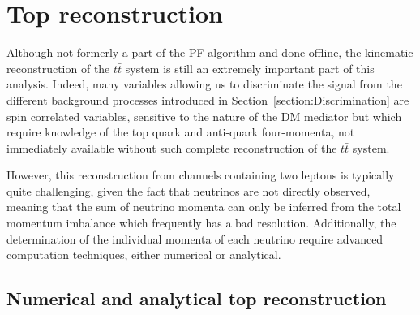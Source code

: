 \documentclass[a4paper, 10pt, openright]{report}
\begin{document}
\section{Top reconstruction} \label{section:RecoTop}

Although not formerly a part of the \ac{PF} algorithm and done offline, the kinematic reconstruction of the $t \bar t$ system is still an extremely important part of this analysis. Indeed, many variables allowing us to discriminate the signal from the different background processes introduced in Section~\ref{section:Discrimination} are spin correlated variables, sensitive to the nature of the \ac{DM} mediator but which require knowledge of the top quark and anti-quark four-momenta, not immediately available without such complete reconstruction of the $t \bar t$ system. 

However, this reconstruction from channels containing two leptons is typically quite challenging, given the fact that neutrinos are not directly observed, meaning that the sum of neutrino momenta can only be inferred from the total momentum imbalance which frequently has a bad resolution. Additionally, the determination of the individual momenta of each neutrino require advanced computation techniques, either numerical or analytical.

\subsection{Numerical and analytical top reconstruction}
\end{document}
